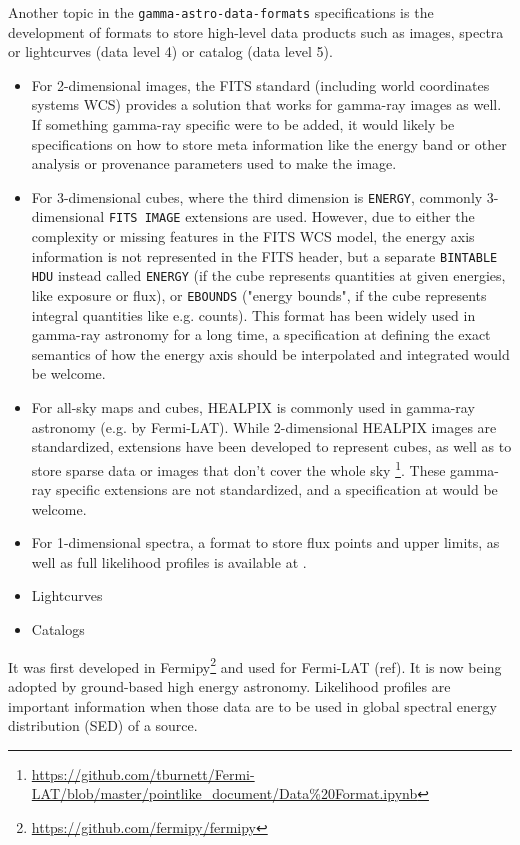 Another topic in the \texttt{gamma-astro-data-formats} specifications is the development of formats to store high-level data products such as images, spectra or lightcurves (data level 4) or catalog (data level 5).

\begin{itemize}
\item{} For 2-dimensional images, the FITS standard (including world coordinates systems WCS) provides a solution that works for gamma-ray images as well. If something gamma-ray specific were to be added, it would likely be specifications on how to store meta information like the energy band or other analysis or provenance parameters used to make the image.
\item{} For 3-dimensional cubes, where the third dimension is \texttt{ENERGY}, commonly 3-dimensional \texttt{FITS IMAGE} extensions are used. However, due to either the complexity or missing features in the FITS WCS model, the energy axis information is not represented in the FITS header, but a separate \texttt{BINTABLE HDU} instead called \texttt{ENERGY} (if the cube represents quantities at given energies, like exposure or flux), or \texttt{EBOUNDS} ("energy bounds", if the cube represents integral quantities like e.g. counts).
This format has been widely used in gamma-ray astronomy for a long time, a specification at \gadf defining the exact semantics of how the energy axis should be interpolated and integrated would be welcome.
\item{} For all-sky maps and cubes, HEALPIX is commonly used in gamma-ray astronomy (e.g. by Fermi-LAT). While 2-dimensional HEALPIX images are standardized, extensions have been developed to represent cubes, as well as to store sparse data or images that don't cover the whole sky \footnote{\url{https://github.com/tburnett/Fermi-LAT/blob/master/pointlike_document/Data\%20Format.ipynb}}. These gamma-ray specific extensions are not standardized, and a specification at \gadf would be welcome.
\item{} For 1-dimensional spectra, a format to store flux points and upper limits, as well as full likelihood profiles is available at \gadf.
\item{} Lightcurves
\item{} Catalogs
\end{itemize}

It was first developed in Fermipy\footnote{\url{https://github.com/fermipy/fermipy}} and used for Fermi-LAT (ref). It is now being adopted by ground-based high energy astronomy. Likelihood profiles are important information when those data are to be used in global spectral energy distribution (SED) of a source. 

